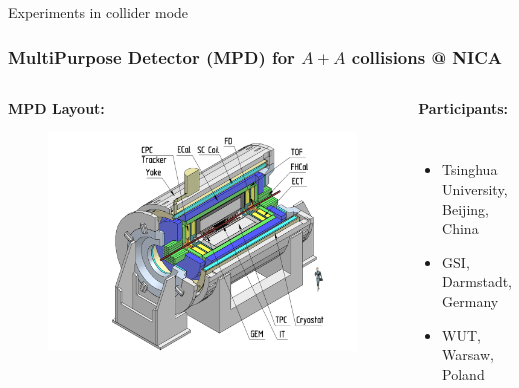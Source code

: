 \documentclass[dvipsnames] {beamer}
\begin{document}
\begin{frame}
  \bf
  \begin{block}{}
    \begin{center}
      {\Huge Experiments in collider mode}
    \end{center}
  \end{block}
\end{frame}

\begin{frame}
  \bf
  \frametitle{\centering \bf {\small MultiPurpose Detector (MPD) for $A + A$ collisions @ NICA}}
  \begin{columns}[t]
    \vskip -0.5cm
    \begin{block}{\bf \centering MPD Layout:}
      \begin{figure}[H]
        \includegraphics[width=1.\textwidth]{mpd.png} 
      \end{figure}
    \end{block}
    \vskip -0.3cm
           {\tiny 
             \begin{block}{\bf \centering Participants:}           
               \begin{columns}[t]
                 \vskip -0.4cm
                 \begin{itemize}
                 \item Tsinghua University, Beijing, China
                 \item GSI, Darmstadt, Germany
                 \item WUT, Warsaw, Poland
                 \end{itemize}
                 

\end{columns}
\end{block}}
\end{columns}
\end{frame}
\end{document}
